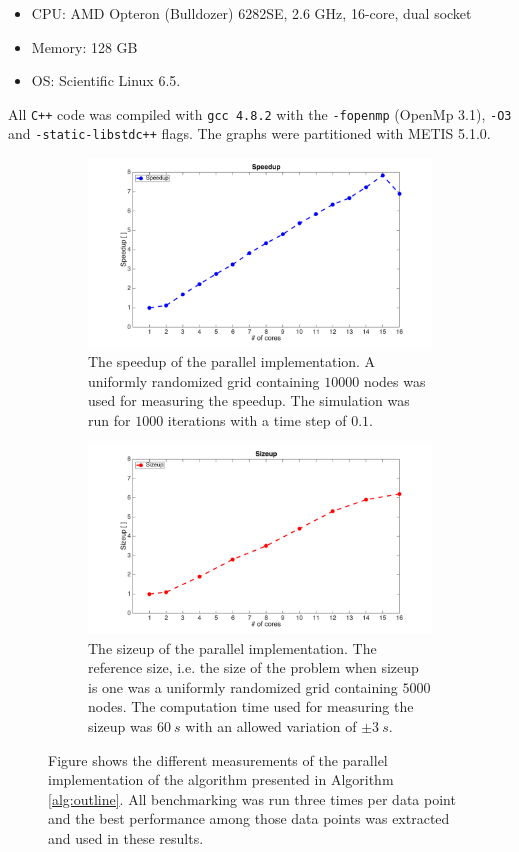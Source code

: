 \begin{itemize}
\item CPU: AMD Opteron (Bulldozer) 6282SE, 2.6 GHz, 16-core, dual socket
\item Memory: 128 GB
\item OS: Scientific Linux 6.5.
\end{itemize}

\noindent All \texttt{C++} code was compiled with \texttt{gcc 4.8.2} with the \texttt{-fopenmp} (OpenMp 3.1), \texttt{-O3} and  \texttt{-static-libstdc++} flags. The graphs were partitioned with METIS 5.1.0. 

\begin{figure}
\centering
\begin{subfigure}[b]{1\textwidth}
\includegraphics[width=\textwidth, height=0.5\textwidth]{img/speedup.png}
\caption{The speedup of the parallel implementation. A uniformly randomized grid containing $10000$ nodes was used for measuring the speedup. The simulation was run for $1000$ iterations with a time step of $0.1$.}
\end{subfigure}

\begin{subfigure}[b]{1\textwidth}
\includegraphics[width=\textwidth, height=0.5\textwidth]{img/sizeup.png}
\caption{The sizeup of the parallel implementation. The reference size, i.e. the size of the problem when sizeup is one was a uniformly randomized grid containing $5000$ nodes. The computation time used for measuring the sizeup was $60~s$ with an allowed variation of $\pm 3~s$. }
\end{subfigure}
\caption{Figure shows the different measurements of the parallel implementation of the algorithm presented in Algorithm \ref{alg:outline}. All benchmarking was run three times per data point and the best performance among those data points was extracted and used in these results.}
\label{fig:speed_size}
\end{figure}

